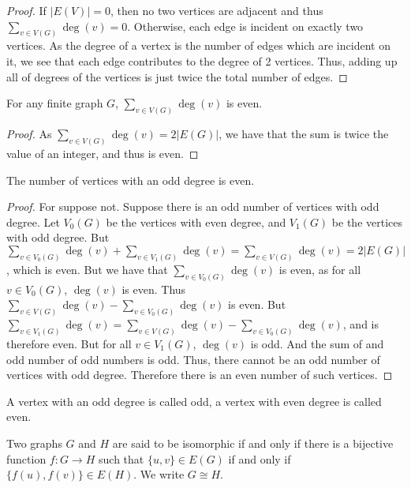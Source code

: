         \begin{proof}
        If $|E(V)| = 0$, then no two vertices are adjacent and thus $\sum_{v\in V(G)}\deg(v) = 0$. Otherwise, each edge is incident on exactly two vertices. As the degree of a vertex is the number of edges which are incident on it, we see that each edge contributes to the degree of 2 vertices. Thus, adding up all of degrees of the vertices is just twice the total number of edges.
        \end{proof}
        \begin{corollary}
        For any finite graph $G$, $\sum_{v\in V(G)}\deg(v)$ is even.
        \end{corollary}
        \begin{proof} As $\sum_{v\in V(G)}\deg(v) = 2|E(G)|$, we have that the sum is twice the value of an integer, and thus is even.
        \end{proof}
        \begin{corollary}
        The number of vertices with an odd degree is even.
        \end{corollary}
        \begin{proof}
        For suppose not. Suppose there is an odd number of vertices with odd degree. Let $V_0(G)$ be the vertices with even degree, and $V_1(G)$ be the vertices with odd degree. But $\sum_{v\in V_0(G)}\deg(v) + \sum_{v\in V_1(G)} \deg(v) = \sum_{v\in V(G)}\deg(v) = 2|E(G)|$, which is even. But we have that $\sum_{v\in V_0(G)}\deg(v)$ is even, as for all $v\in V_{0}(G)$, $\deg(v)$ is even. Thus $\sum_{v\in V(G)}\deg(v) - \sum_{v\in V_0(G)}\deg(v)$ is even. But $\sum_{v\in V_1(G)}\deg(v) = \sum_{v\in V(G)}\deg(v) - \sum_{v\in V_0(G)}\deg(v)$, and is therefore even. But for all $v\in V_1(G)$, $\deg(v)$ is odd. And the sum of and odd number of odd numbers is odd. Thus, there cannot be an odd number of vertices with odd degree. Therefore there is an even number of such vertices.
        \end{proof}
        \begin{definition}
        A vertex with an odd degree is called odd, a vertex with even degree is called even.
        \end{definition}
        \begin{definition}
        Two graphs $G$ and $H$ are said to be isomorphic if and only if there is a bijective function $f:G\rightarrow H$ such that $\{u,v\}\in E(G)$ if and only if $\{f(u),f(v)\}\in E(H)$. We write $G \cong H$.
        \end{definition}
